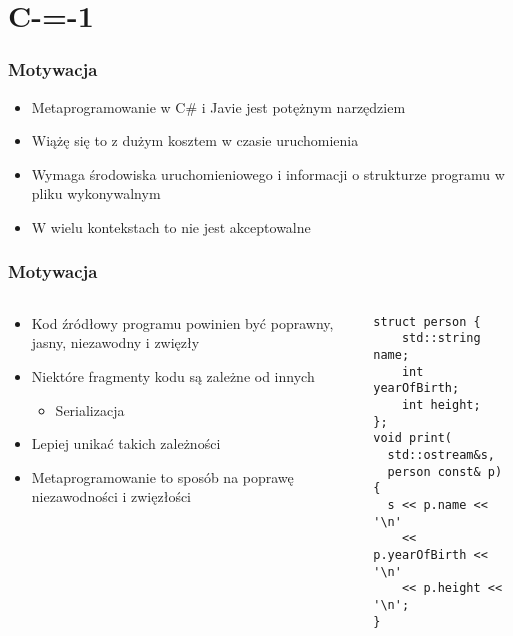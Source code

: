 \section{C-=-1}

\begin{frame}
	\frametitle{Motywacja}

	\begin{itemize}
		\item Metaprogramowanie w C\# i Javie jest potężnym narzędziem
		\item Wiążę się to z dużym kosztem w czasie uruchomienia
		\item Wymaga środowiska uruchomieniowego i informacji o strukturze programu w pliku wykonywalnym
		\item W wielu kontekstach to nie jest akceptowalne
	\end{itemize}
\end{frame}

\begin{frame}[fragile]
	\frametitle{Motywacja}
	\begin{columns}
		\begin{column}{0.5\textwidth}
\begin{itemize}
	\item Kod źródłowy programu powinien być poprawny, jasny, niezawodny i zwięzły
	\item Niektóre fragmenty kodu są zależne od innych\begin{itemize}
		\item Serializacja
	\end{itemize}
	\item Lepiej unikać takich zależności
	\item Metaprogramowanie to sposób na poprawę niezawodności i zwięzłości
\end{itemize}
		\end{column}
		\begin{column}{0.5\textwidth}  %
			\begin{center}
\begin{lstlisting}
struct person {
	std::string name;
	int yearOfBirth;
	int height;
};
void print(
  std::ostream&s,
  person const& p) {
  s << p.name << '\n'
    << p.yearOfBirth << '\n'
    << p.height << '\n';
}
\end{lstlisting}
			 \end{center}
		\end{column}
		\end{columns}

\end{frame}

